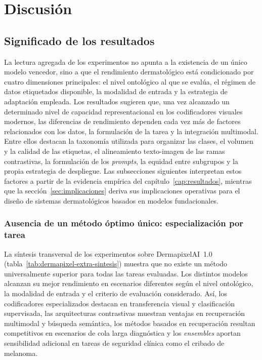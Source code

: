 
\chapter{Discusión}
\label{cap:discusion}

\section{Significado de los resultados}
\label{sec:significado}

La lectura agregada de los experimentos no apunta a la existencia de
un único modelo vencedor, sino a que el rendimiento dermatológico está
condicionado por cuatro dimensiones principales: el nivel ontológico al
que se evalúa, el régimen de datos etiquetados disponible, la modalidad
de entrada y la estrategia de adaptación empleada. Los resultados
sugieren que, una vez alcanzado un determinado nivel de capacidad
representacional en los codificadores visuales modernos, las diferencias
de rendimiento dependen cada vez más de factores relacionados con los
datos, la formulación de la tarea y la integración multimodal. Entre
ellos destacan la taxonomía utilizada para organizar las clases, el
volumen y la calidad de las etiquetas, el alineamiento texto-imagen de
las ramas contrastivas, la formulación de los \emph{prompts}, la equidad
entre subgrupos y la propia estrategia de despliegue. Las subsecciones
siguientes interpretan estos factores a partir de la evidencia empírica
del capítulo~\ref{cap:resultados}, mientras que la
sección~\ref{sec:implicaciones} deriva sus implicaciones operativas para
el diseño de sistemas dermatológicos basados en modelos fundacionales.

\subsection{Ausencia de un método óptimo único: especialización por tarea}
\label{sec:disc-especializacion}

La síntesis transversal de los experimentos sobre DermapixelAI~1.0
(tabla~\ref{tab:dermapixel-extra-sintesis}) muestra que no existe un
método universalmente superior para todas las tareas evaluadas. Los
distintos modelos alcanzan su mejor rendimiento en escenarios diferentes
según el nivel ontológico, la modalidad de entrada y el criterio de
evaluación considerado. Así, los codificadores especializados destacan en
transferencia visual y clasificación supervisada, las arquitecturas
contrastivas muestran ventajas en recuperación multimodal y búsqueda
semántica, los métodos basados en recuperación resultan competitivos en
escenarios de cola larga diagnóstica y los \emph{ensembles} aportan
sensibilidad adicional en tareas de seguridad clínica como el cribado de
melanoma.

